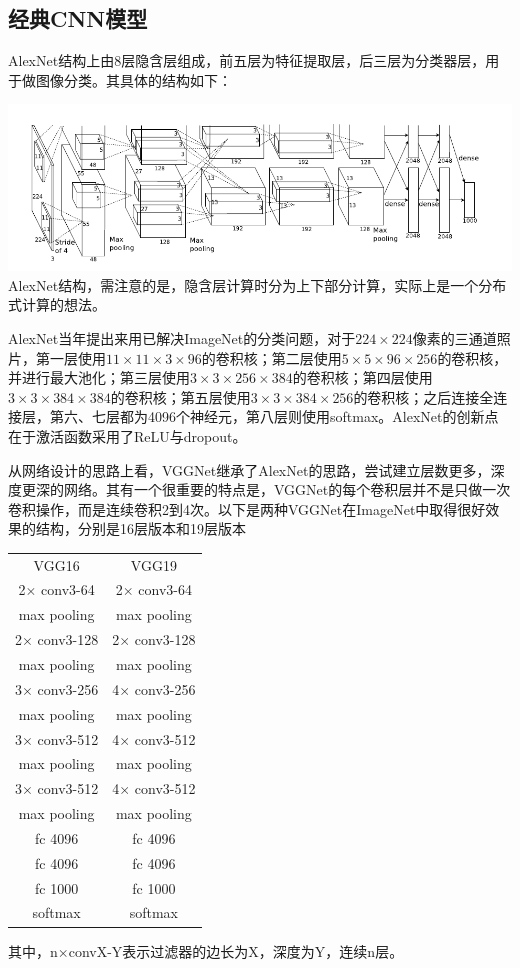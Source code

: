 \subsection{经典CNN模型}
AlexNet结构上由8层隐含层组成，前五层为特征提取层，后三层为分类器层，用于做图像分类。其具体的结构如下：
\begin{center}
\includegraphics[scale=0.6]{../figures/AlexNet.png} \\
AlexNet结构，需注意的是，隐含层计算时分为上下部分计算，实际上是一个分布式计算的想法。
\end{center}
AlexNet当年提出来用已解决ImageNet的分类问题，对于$224\times224$像素的三通道照片，第一层使用$11\times11\times3\times96$的卷积核；第二层使用$5\times5\times96\times256$的卷积核，并进行最大池化；第三层使用$3\times3\times256\times384$的卷积核；第四层使用$3\times3\times384\times384$的卷积核；第五层使用$3\times3\times384\times256$的卷积核；之后连接全连接层，第六、七层都为4096个神经元，第八层则使用softmax。AlexNet的创新点在于激活函数采用了ReLU与dropout。

从网络设计的思路上看，VGGNet继承了AlexNet的思路，尝试建立层数更多，深度更深的网络。其有一个很重要的特点是，VGGNet的每个卷积层并不是只做一次卷积操作，而是连续卷积2到4次。以下是两种VGGNet在ImageNet中取得很好效果的结构，分别是16层版本和19层版本
\begin{center}
\begin{tabular}{cc}
\toprule[2pt]
VGG16 & VGG19 \\ 
2$\times$ conv3-64 & 2$\times$ conv3-64 \\  
max pooling & max pooling \\  
2$\times$ conv3-128 & 2$\times$ conv3-128 \\  
max pooling & max pooling \\  
3$\times$ conv3-256 & 4$\times$ conv3-256 \\  
max pooling & max pooling \\ 
3$\times$ conv3-512 & 4$\times$ conv3-512 \\  
max pooling & max pooling \\ 
3$\times$ conv3-512 & 4$\times$ conv3-512 \\  
max pooling & max pooling  \\  
fc 4096 & fc 4096 \\ 
fc 4096 & fc 4096 \\ 
fc 1000 & fc 1000 \\ 
softmax & softmax \\ 
\bottomrule[2pt]
\end{tabular} 
\end{center}
其中，n$\times$convX-Y表示过滤器的边长为X，深度为Y，连续n层。

